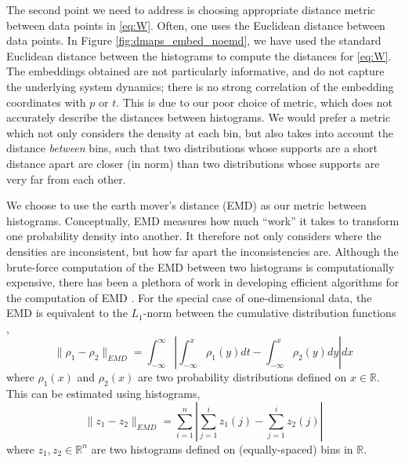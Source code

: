 \documentclass[prl, reprint, final, showkeys]{revtex4-1}
\begin{document}
The second point we need to address is choosing appropriate distance metric between data points in \eqref{eq:W}.
%
Often, one uses the Euclidean distance between data points.
%
In Figure \ref{fig:dmaps_embed_noemd}, we have used the standard Euclidean distance between the histograms to compute the distances for \eqref{eq:W}.
%
The embeddings obtained are not particularly informative, and do not capture the underlying system dynamics; there is no strong correlation of the embedding coordinates with $p$ or $t$. 
%
This is due to our poor choice of metric, which does not accurately describe the distances between histograms.
%
We would prefer a metric which not only considers the density at each bin, but also takes into account the distance {\em between} bins,
such that two distributions whose supports are a short distance apart are closer (in norm) than two distributions whose supports are very far from each other.
%
%

We choose to use the earth mover's distance (EMD) \cite{rubner2000earth} as our metric between histograms.
%
Conceptually, EMD measures how much ``work'' it takes to transform one probability density into another.
%
It therefore not only considers where the densities are inconsistent, but how far apart the inconsistencies are.
%
Although the brute-force computation of the EMD between two histograms is computationally expensive, there has been a plethora of work in developing efficient algorithms for the computation of EMD \cite{...}.
%
%
%
For the special case of one-dimensional data, the EMD is equivalent to the $L_1$-norm between the cumulative distribution functions \cite{...},
\begin{equation}
\| \rho_1  - \rho_2 \|_{EMD} = \int_{-\infty}^{\infty} \left| \int_{-\infty}^x \rho_1(y) dt - \int_{-\infty}^x \rho_2(y) dy \right| dx
\end{equation}
where $\rho_1(x)$ and $\rho_2(x)$ are two probability distributions defined on $x \in \mathbb{R}$. 
%
This can be estimated using histograms, 
\begin{equation}
\| z_1 - z_2 \|_{EMD} = \sum_{i=1}^{n} \left| \sum_{j=1}^i z_1(j) - \sum_{j=1}^i z_2(j) \right|
\end{equation}
where $z_1, z_2 \in \mathbb{R}^n$ are two histograms defined on (equally-spaced) bins in $\mathbb{R}$. 
\end{document}
